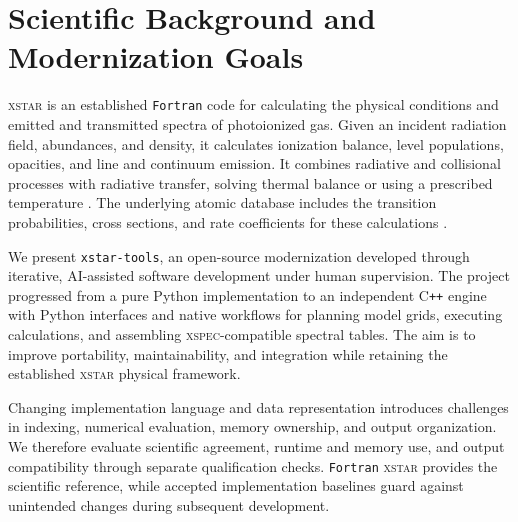 \documentclass[11pt,twoside]{article}
\begin{document}



\section{Scientific Background and Modernization Goals}
\textsc{xstar} is an established \texttt{Fortran} code for calculating the physical conditions and emitted and transmitted spectra of photoionized gas. Given an incident radiation field, abundances, and density, it calculates ionization balance, level populations, opacities, and line and continuum emission. It combines radiative and collisional processes with radiative transfer, solving thermal balance or using a prescribed temperature \citep{Kallman2001,Kallman2004}. The underlying atomic database includes the transition probabilities, cross sections, and rate coefficients for these calculations \citep{Bautista2001}.

We present {\tt xstar-tools}, an open-source modernization developed through iterative, AI-assisted software development under human supervision. The project progressed from a pure Python implementation to an independent C{}\texttt{++} engine with Python interfaces and native workflows for planning model grids, executing calculations, and assembling \textsc{xspec}-compatible spectral tables. The aim is to improve portability, maintainability, and integration while retaining the established \textsc{xstar} physical framework.

Changing implementation language and data representation introduces challenges in indexing, numerical evaluation, memory ownership, and output organization. We therefore evaluate scientific agreement, runtime and memory use, and output compatibility through separate qualification checks. \texttt{Fortran} \textsc{xstar} provides the scientific reference, while accepted implementation baselines guard against unintended changes during subsequent development.
\end{document}
